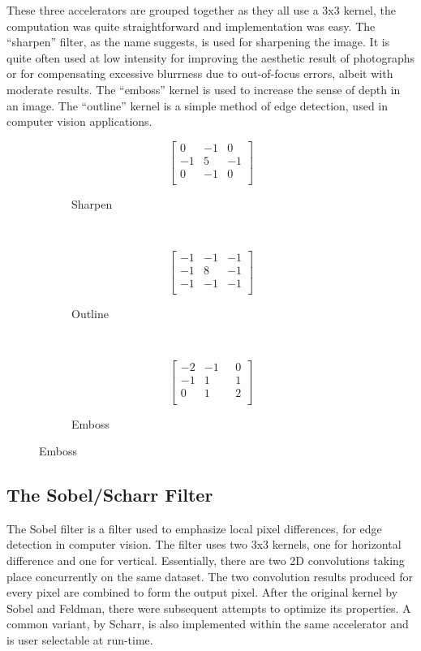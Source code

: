 These three accelerators are grouped together as they all use a 3x3 kernel,
the computation was quite straightforward and implementation was easy.
The ``sharpen'' filter, as the name suggests, is used for sharpening the image.
It is quite often used at low intensity for improving the aesthetic result of
photographs or for compensating excessive blurrness due to out-of-focus errors,
albeit with moderate results. 
The ``emboss'' kernel is used to increase the sense of depth in an image.
The ``outline'' kernel is a simple method
of edge detection, used in computer vision applications.


\begin{figure}[H]
\centering
\begin{subfigure}[b]{.3\linewidth}
	\[
	\left[
	\begin{array}{rrr}
	0  & -1  &  0 \\
	-1 &  5  & -1 \\
	0  & -1  &  0 \\
	\end{array}
	\right]
	\]
	\caption{Sharpen}
\end{subfigure}
~
\begin{subfigure}[b]{.3\linewidth}
	\[
	\left[
	\begin{array}{rrr}
	-1  & -1  & -1 \\
	-1  &  8  & -1 \\
	-1  & -1  & -1 \\
	\end{array}
	\right]
	\]
	\caption{Outline}
\end{subfigure}
~
\begin{subfigure}[b]{.3\linewidth}
	\[
	\left[
	\begin{array}{rrr}
	-2  & -1  &  ~~~0 \\
	-1  &  1  &  ~~~1 \\
	 0  &  1  &  ~~~2 \\
	\end{array}
	\right]
	\]
	\caption{Emboss}
\end{subfigure}
\end{figure}

\subsection{The Sobel/Scharr Filter}

The Sobel filter is a filter used to emphasize local pixel differences,
for edge detection in computer vision. The filter uses two 3x3 kernels,
one for horizontal difference and one for vertical. Essentially,
there are two 2D convolutions taking place concurrently on the same dataset.
The two convolution results produced for every pixel are combined to
form the output pixel. After the original kernel by Sobel and Feldman,
there were subsequent attempts to optimize its properties. A common variant,
by Scharr, is also implemented within the same accelerator and is user selectable at run-time.

